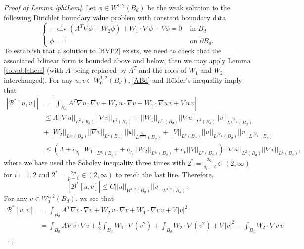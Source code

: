\documentclass[12pt,reqno]{amsart}
\theoremstyle{plain}
\theoremstyle{definition}
\DeclareMathOperator{\di}{div}
\newcommand{\La}{\Lambda}
\newcommand{\iny}{\infty}
\newcommand{\del}{ \partial}
\newcommand{\gr}{\nabla}
\newcommand{\norm}[1]{\left\vert \left\vert #1\right\vert\right\vert}
\newcommand{\abs}[1]{\left\vert#1\right\vert}
\newcommand{\brac}[1]{\left[#1\right]}
\newcommand{\pr}[1]{\left( #1 \right) }
\begin{document}
\begin{proof}[Proof of Lemma \ref{phiLem}]
Let $\phi \in W^{1,2}\pr{B_d}$ be the weak solution to the following Dirichlet boundary value problem with constant boundary data
\begin{equation}
\left\{ \begin{array}{rl}- \di \pr{A^T \gr \phi + W_2 \phi} + W_1 \cdot \gr \phi + V \phi  = 0 & \text{ in } B_d \\ \phi = 1  & \text{ on } \del B_d . \end{array}\right.
\label{BVP2}
\end{equation}
To establish that a solution to \eqref{BVP2} exists, we need to check that the associated bilinear form is bounded above and below, then we may apply Lemma \ref{solvableLem} (with $A$ being replaced by $A^T$ and the roles of $W_1$ and $W_2$ interchanged).
For any $u, v \in W^{1,2}_0\pr{B_d}$, \eqref{ABd} and H\"older's inequality imply that
\begin{align*}
|\mathcal B^* \brac{u, v}| 
&= \abs{\int_{B_d} A^T \gr u \cdot \gr v + W_2 \, u \cdot \gr v + W_1 \cdot \gr u \, v + V \, u \, v} \\
&\le \La \norm{\gr u}_{L^2\pr{B_d}} \norm{\gr v}_{L^2\pr{B_d}} 
+ \norm{W_1}_{L^{q_1}\pr{B_d}} \norm{\gr u}_{L^2\pr{B_d}} \norm{v}_{L^{\frac{2q_1}{q_1-2}}\pr{B_d}} \\
&+ \norm{W_2}_{L^{q_2}\pr{B_d}} \norm{\gr v}_{L^2\pr{B_d}} \norm{u}_{L^{\frac{2q_2}{q_2-2}}\pr{B_d}}  
+ \norm{V}_{L^p\pr{B_d}} \norm{u}_{L^{\frac{2p}{p-1}}\pr{B_d}} \norm{v}_{L^{\frac{2p}{p-1}}\pr{B_d}} \\
&\le \pr{\La + c_{q_1} \norm{W_1}_{L^{q_1}\pr{B_d}} + c_{q_2} \norm{W_2}_{L^{q_2}\pr{B_d}} + c_p \norm{V}_{L^p\pr{B_d}}} \norm{\gr u}_{L^2\pr{B_d}} \norm{\gr v}_{L^2\pr{B_d}},
\end{align*}
where we have used the Sobolev inequality three times with $2^* = \frac{2q_i}{q_i -2} \in \pr{2, \iny}$ for $i = 1, 2$ and $2^* = \frac{2p}{p-1} \in \pr{2, \iny}$ to reach the last line.
Therefore,
$$\abs{\mathcal B^* \brac{u,v}} \le C \norm{u}_{W^{1,2}\pr{B_d}} \norm{v}_{W^{1,2}\pr{B_d}}.$$
For any $v \in W^{1,2}_0\pr{B_d}$, we see that
\begin{align*}
\mathcal B^* \brac{v, v}
&= \int_{B_d} A^T \gr v \cdot \gr v + W_2 \, v \cdot \gr v + W_1 \cdot \gr v \, v + V \, \abs{v}^2 \\
&= \int_{B_d} A \gr v \cdot \gr v 
+ \frac 1 2 \int_{B_d}  W_1 \cdot \gr\pr{ v^2} 
+ \int_{B_d} W_2 \cdot \gr\pr{ v^2} + V \, \abs{v}^2 
- \int_{B_d}  W_2 \cdot \gr v \, v \\

\end{align*}
\end{proof}
\end{document}
